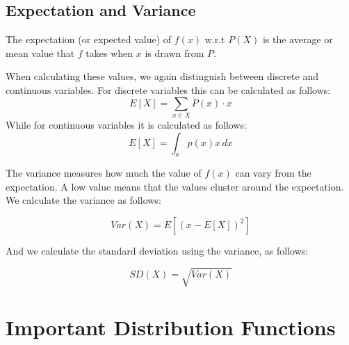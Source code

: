 \subsection{Expectation and Variance}%
\label{subsec:label}

The expectation (or expected value) of $f(x)$ w.r.t $P(X)$ is the average or mean value that $f$ takes when $x$ is drawn from $P$.

When calculating these values, we again distinguish between discrete and continuous variables. For discrete variables this can be calculated as follows:
\begin{equation}
	E[X] = \sum_{x \in X} P(x) \cdot x
\end{equation}
While for continuous variables it is calculated as follows:
\begin{equation}
	E[X] = \int_{x} p(x)x \, dx
\end{equation}

The variance measures how much the value of $f(x)$ can vary from the expectation. A low value means that the values cluster around the expectation. We calculate the variance as follows:

\begin{equation}
	Var(X) = E \left[ (x-E[X])^{2} \right]
\end{equation}

And we calculate the standard deviation using the variance, as follows:

\begin{equation}
	SD(X) = \sqrt{Var(X)}
\end{equation}

\section{Important Distribution Functions}%
\label{sec:label}







